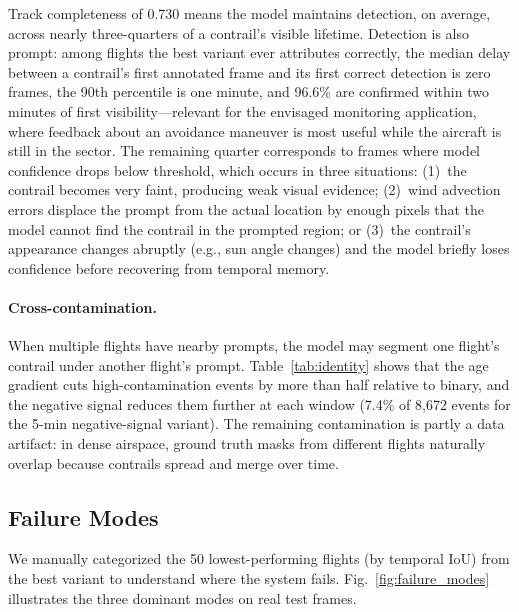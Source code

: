 \documentclass[review]{elsarticle}
\begin{document}
Track completeness of 0.730 means the model maintains detection, on average, across nearly three-quarters of a contrail's visible lifetime. Detection is also prompt: among flights the best variant ever attributes correctly, the median delay between a contrail's first annotated frame and its first correct detection is zero frames, the 90th percentile is one minute, and 96.6\% are confirmed within two minutes of first visibility---relevant for the envisaged monitoring application, where feedback about an avoidance maneuver is most useful while the aircraft is still in the sector. The remaining quarter corresponds to frames where model confidence drops below threshold, which occurs in three situations: (1)~the contrail becomes very faint, producing weak visual evidence; (2)~wind advection errors displace the prompt from the actual location by enough pixels that the model cannot find the contrail in the prompted region; or (3)~the contrail's appearance changes abruptly (e.g., sun angle changes) and the model briefly loses confidence before recovering from temporal memory.

\paragraph{Cross-contamination.} When multiple flights have nearby prompts, the model may segment one flight's contrail under another flight's prompt. Table~\ref{tab:identity} shows that the age gradient cuts high-contamination events by more than half relative to binary, and the negative signal reduces them further at each window (7.4\% of 8{,}672 events for the 5-min negative-signal variant). The remaining contamination is partly a data artifact: in dense airspace, ground truth masks from different flights naturally overlap because contrails spread and merge over time.

\subsection{Failure Modes}

We manually categorized the 50 lowest-performing flights (by temporal IoU) from the best variant to understand where the system fails. Fig.~\ref{fig:failure_modes} illustrates the three dominant modes on real test frames.
\end{document}
